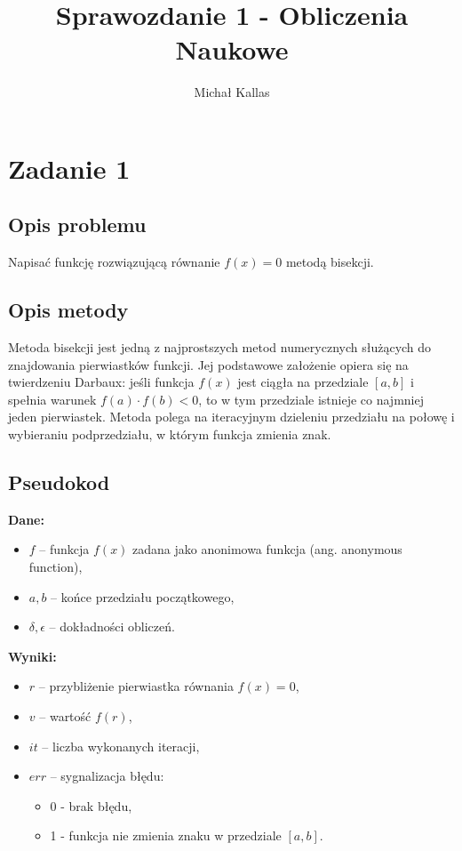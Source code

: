 \documentclass{article}
\title{Sprawozdanie 1 - Obliczenia Naukowe}
\author{Michał Kallas}
\begin{document}
\maketitle

\section{Zadanie 1}
\subsection{Opis problemu}
Napisać funkcję rozwiązującą równanie \( f(x) = 0 \) metodą bisekcji.

\subsection{Opis metody}
Metoda bisekcji jest jedną z najprostszych metod numerycznych służących do znajdowania pierwiastków funkcji. Jej podstawowe założenie opiera się na twierdzeniu Darbaux: jeśli funkcja $f(x)$ jest ciągła na przedziale $[a, b]$ i spełnia warunek $f(a) \cdot f(b) < 0$, to w tym przedziale istnieje co najmniej jeden pierwiastek. Metoda polega na iteracyjnym dzieleniu przedziału na połowę i wybieraniu podprzedziału, w którym funkcja zmienia znak. 

\subsection{Pseudokod}
\textbf{Dane:}
\begin{itemize}
  \item \( f \) – funkcja \( f(x) \) zadana jako anonimowa funkcja (ang. anonymous function),
  \item \( a, b \) – końce przedziału początkowego,
  \item \( \delta, \epsilon \) – dokładności obliczeń.
\end{itemize}

\noindent \textbf{Wyniki:}
\begin{itemize}
  \item \( r \) – przybliżenie pierwiastka równania \( f(x) = 0 \),
  \item \( v \) – wartość \( f(r) \),
  \item \( it \) – liczba wykonanych iteracji,
  \item \( err \) – sygnalizacja błędu:
  \begin{itemize}
    \item 0 - brak błędu,
    \item 1 - funkcja nie zmienia znaku w przedziale \([a, b]\).
  \end{itemize}
\end{itemize}
\end{document}
